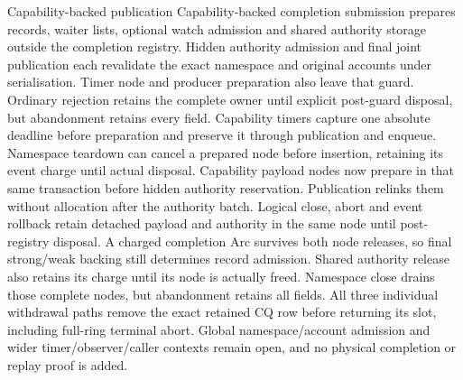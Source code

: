 \begin{implementationdetail}{Capability-backed publication}
Capability-backed completion submission prepares records, waiter lists, optional
watch admission and shared authority storage outside the completion registry.
Hidden authority admission and final joint publication each revalidate the exact
namespace and original accounts under serialisation. Timer node and producer
preparation also leave that guard. Ordinary rejection retains the complete owner
until explicit post-guard disposal, but abandonment retains every field.
Capability timers capture one absolute deadline before preparation and preserve
it through publication and enqueue. Namespace teardown can cancel a prepared
node before insertion, retaining its event charge until actual disposal.
Capability payload nodes now prepare in that same transaction before hidden
authority reservation. Publication relinks them without allocation after the
authority batch. Logical close, abort and event rollback retain detached
payload and authority in the same node until post-registry disposal. A charged
completion Arc survives both node releases, so final strong/weak backing still
determines record admission. Shared authority release also retains its charge
until its node is actually freed. Namespace close drains those complete nodes, but
abandonment retains all fields. All three individual withdrawal paths remove
the exact retained CQ row before returning its slot, including full-ring
terminal abort. Global namespace/account admission and wider timer/observer/caller contexts
remain open, and no physical completion or replay proof is added.
\end{implementationdetail}

